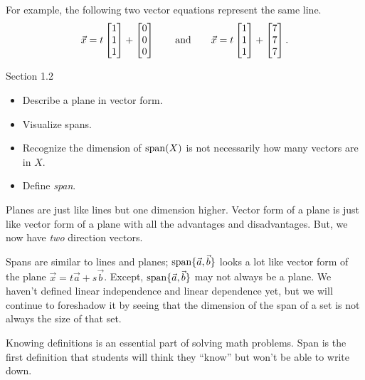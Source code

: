 \begin{parts}
\begin{solution}
				For example, the following two vector equations represent the
				same line.
				\[
					\vec x = t \mat{1\\1\\1} + \mat{0\\0\\0}
					\qquad \text{and} \qquad
					\vec x = t \mat{1\\1\\1} + \mat{7\\7\\7}.
				\]
			\end{solution}
	\end{parts}


\begin{lesson}

	Section 1.2

	\begin{itemize}
		\item Describe a plane in vector form.
		\item Visualize spans.
		\item Recognize the dimension of $\operatorname{span}(X)$ is not necessarily how many vectors
			are in $X$.
		\item Define \emph{span}.
	\end{itemize}

	Planes are just like lines but one dimension higher. Vector form of a plane is just like
	vector form of a plane with all the advantages and disadvantages. But, we now have
	\emph{two} direction vectors.

	Spans are similar to lines and planes; $\operatorname{span}\{\vec a,\vec b\}$ looks a lot like
	vector form of the plane
	$\vec x=t\vec a+s\vec b$. Except, $\operatorname{span}\{\vec a,\vec b\}$ may not always be a plane.
	We haven't defined linear independence and linear dependence yet, but we will continue to
	foreshadow it by seeing that the dimension of the span of a set is not always the size of
	that set.

	Knowing definitions is an essential part of solving math problems. Span is
	the first definition that students will think they ``know'' but won't be
	able to write down.

\end{lesson}

	\bookonlynewpage

